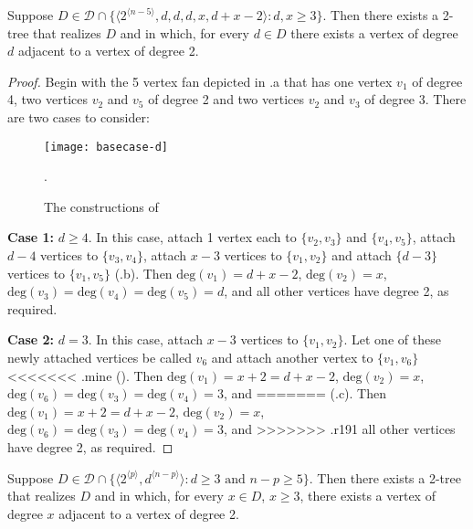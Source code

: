 \documentclass[lotsofwhite,charterfonts]{patmorin}
\newcommand{\rep}[1]{^{\langle#1\rangle}}
\newcommand{\degree}{\mathrm{deg}}
\begin{document}
\begin{lem}
Suppose $D\in \mathcal{D}\cap \{\langle 2\rep{n-5},d,d,d,x,d+x-2 \rangle:
\mbox{$d,x\ge 3$}\}$.
Then there exists a 2-tree that realizes $D$ and in which, for every
$d\in D$ there exists a vertex of degree $d$ adjacent to a vertex of
degree 2.
\end{lem}

\begin{proof}
Begin with the 5 vertex fan depicted in .a that has
one vertex $v_1$ of degree 4, two vertices $v_2$ and $v_5$ of degree 2
and two vertices $v_2$ and $v_3$ of degree 3.  
There are two cases to
consider:

\begin{figure}
\begin{center}
\texttt{[image: basecase-d]}
\caption{The constructions of }.
\end{center}
\end{figure}

\noindent\textbf{Case 1:} $d\ge 4$.  In this case, attach 1 vertex
each to $\{v_2,v_3\}$ and $\{v_4,v_5\}$, attach $d-4$ vertices to
$\{v_3,v_4\}$, attach $x-3$ vertices to $\{v_1,v_2\}$ and attach
$\{d-3\}$ vertices to $\{v_1,v_5\}$ (.b).  Then
$\degree(v_1)=d+x-2$, $\degree(v_2)=x$,
$\degree(v_3)=\degree(v_4)=\degree(v_5)=d$, and all other vertices
have degree 2, as required.

\noindent\textbf{Case 2:} $d=3$.  In this case, attach $x-3$ vertices
to $\{v_1,v_2\}$.  Let one of these newly attached vertices be called
$v_6$ and attach another vertex to $\{v_1,v_6\}$
<<<<<<< .mine
().  Then $\degree(v_1)=x+2=d+x-2$,
$\degree(v_2)=x$, $\degree(v_6)=\degree(v_3)=\degree(v_4)=3$, and 
=======
(.c).  Then $\degree(v_1)=x+2=d+x-2$,
$\degree(v_2)=x$, $\degree(v_6)=\degree(v_3)=\degree(v_4)=3$, and
>>>>>>> .r191
all other vertices have degree 2, as required. 
\end{proof}


\begin{lem}
Suppose $D\in \mathcal{D}\cap \{\langle 2\rep{p},d\rep{n-p}\rangle:
\mbox{$d\ge 3$ and $n-p \ge 5$}\}$.
Then there exists a 2-tree that realizes $D$ and in which, for every
$x\in D$, $x\ge 3$, there exists a vertex
of degree $x$ adjacent to a vertex of degree 2.
\end{lem}
\end{document}
